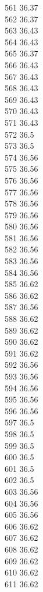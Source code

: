 561	36.37\\
562	36.37\\
563	36.43\\
564	36.43\\
565	36.37\\
566	36.43\\
567	36.43\\
568	36.43\\
569	36.43\\
570	36.43\\
571	36.43\\
572	36.5\\
573	36.5\\
574	36.56\\
575	36.56\\
576	36.56\\
577	36.56\\
578	36.56\\
579	36.56\\
580	36.56\\
581	36.56\\
582	36.56\\
583	36.56\\
584	36.56\\
585	36.62\\
586	36.62\\
587	36.56\\
588	36.62\\
589	36.62\\
590	36.62\\
591	36.62\\
592	36.56\\
593	36.56\\
594	36.56\\
595	36.56\\
596	36.56\\
597	36.5\\
598	36.5\\
599	36.5\\
600	36.5\\
601	36.5\\
602	36.5\\
603	36.56\\
604	36.56\\
605	36.56\\
606	36.62\\
607	36.62\\
608	36.62\\
609	36.62\\
610	36.62\\
611	36.62\\
